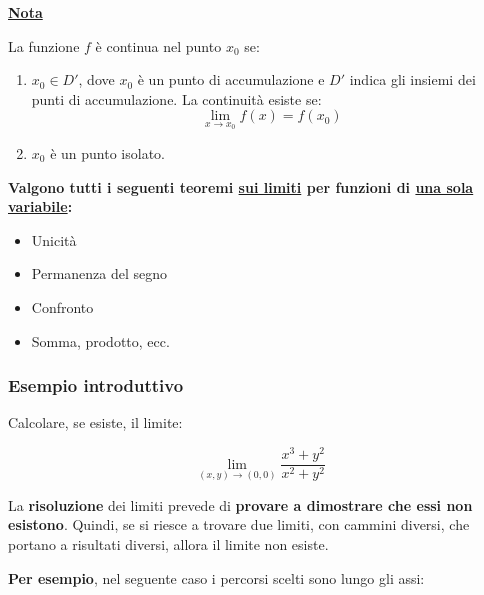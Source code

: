 \documentclass[a4paper]{article}
\begin{document}
	\noindent
	\textcolor{Red3}{\textbf{\underline{Nota}}}\newline
	
	\noindent
	La funzione $f$ è continua nel punto $x_{0}$ se:
	
	\begin{enumerate}[label=\alph*)]
		\item $x_{0} \in D'$, dove $x_{0}$ è un punto di accumulazione e $D'$ indica gli insiemi dei punti di accumulazione. La continuità esiste se:
		\begin{equation*}
			\lim_{x \rightarrow x_{0}} f\left(x\right) = f\left(x_{0}\right)
		\end{equation*}
	
		\item $x_{0}$ è un punto isolato.
	\end{enumerate}

	\noindent
	\textcolor{Red3}{\textbf{Valgono tutti i seguenti teoremi \underline{sui limiti} per funzioni di \underline{una sola variabile}:}}
	
	\noindent
	\begin{itemize}[label=-]
		\item Unicità
		\item Permanenza del segno
		\item Confronto
		\item Somma, prodotto, ecc.
	\end{itemize}

	\newpage
	
	\subsubsection[Esempio introduttivo]{\textcolor{Green4}{Esempio introduttivo}}
	
	Calcolare, se esiste, il limite:
	
	\begin{equation*}
		\lim_{\left(x,y\right) \rightarrow \left(0,0\right)} \dfrac{x^{3} + y^{2}}{x^{2} + y^{2}}
	\end{equation*}

	\noindent
	La \textbf{risoluzione} dei limiti prevede di \textbf{provare a dimostrare che essi non esistono}. Quindi, se si riesce a trovare due limiti, con cammini diversi, che portano a risultati diversi, allora il limite non esiste.\newline
	
	\noindent
	\textcolor{Green4}{\textbf{Per esempio}}, nel seguente caso i percorsi scelti sono lungo gli assi:
	
\end{document}

